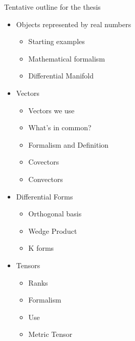 Tentative outline for the thesis
\begin{itemize}
	\item Objects represented by real numbers
	\begin{itemize}
		\item Starting examples
		\item Mathematical formalism
		\item Differential Manifold
	\end{itemize}
	\item Vectors
	\begin{itemize}
		\item Vectors we use
		\item What's in common?
		\item Formalism and Definition
		\item Covectors
		\item Convectors
	\end{itemize}
	\item Differential Forms
	\begin{itemize}
		\item Orthogonal basis
		\item Wedge Product
		\item K forms
	\end{itemize}
	\item Tensors
	\begin{itemize}
		\item Ranks
		\item Formalism
		\item Use
		\item Metric Tensor
	\end{itemize}
\end{itemize}